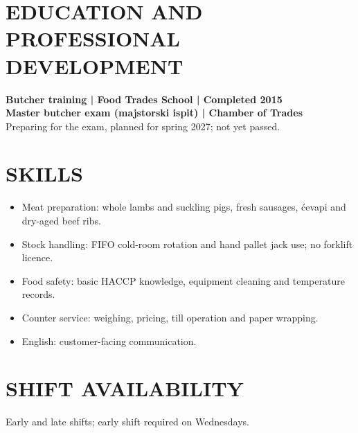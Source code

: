 \documentclass[11pt,a4paper]{article}
\newcommand{\cvsection}[1]{\section*{#1}}
\begin{document}
\cvsection{EDUCATION AND PROFESSIONAL DEVELOPMENT}
\textbf{Butcher training | Food Trades School | Completed 2015}\\
\textbf{Master butcher exam (majstorski ispit) | Chamber of Trades}\\
Preparing for the exam, planned for spring 2027; not yet passed.

\cvsection{SKILLS}
\begin{itemize}
\item Meat preparation: whole lambs and suckling pigs, fresh sausages, ćevapi and dry-aged beef ribs.
\item Stock handling: FIFO cold-room rotation and hand pallet jack use; no forklift licence.
\item Food safety: basic HACCP knowledge, equipment cleaning and temperature records.
\item Counter service: weighing, pricing, till operation and paper wrapping.
\item English: customer-facing communication.
\end{itemize}

\cvsection{SHIFT AVAILABILITY}
Early and late shifts; early shift required on Wednesdays.
\end{document}
